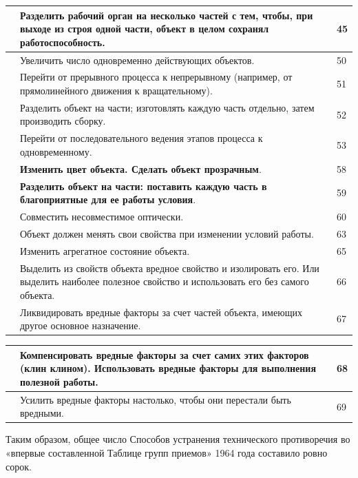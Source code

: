 \documentclass[11pt,a4paper]{article}
\begin{document}
\begin{center}
  \begin{tabular}{|p{}|p{}|p{}|}\hline
&\textbf{Разделить рабочий орган на несколько частей с тем, чтобы, при выходе
      из строя одной части, объект в целом сохранял работоспособность}.  &
    45\\\hline
&Увеличить число одновременно действующих объектов.  & 50\\\hline
&Перейти от прерывного процесса к непрерывному (например, от прямолинейного
движения к вращательному). & 51\\\hline
&Разделить объект на части; изготовлять каждую часть отдельно, затем
производить сборку. & 52\\\hline
&Перейти от последовательного ведения этапов процесса к одновременному. &
53\\\hline
&\textbf{Изменить цвет объекта. Сделать объект прозрачным}. & 58\\\hline
&\textbf{Разделить объект на части: поставить каждую часть в благоприятные для
  ее работы условия}. & 59\\\hline
&Совместить несовместимое оптически.& 60\\\hline
&Объект должен менять свои свойства при изменении условий работы.& 63\\\hline
&Изменить агрегатное состояние объекта.& 65\\\hline
&Выделить из свойств объекта вредное свойство и изолировать его. Или выделить
наиболее полезное свойство и использовать его без самого объекта. & 66\\\hline
&Ликвидировать вредные факторы за счет частей объекта, имеющих другое основное
назначение.& 67\\\hline
  \end{tabular}

  \begin{tabular}{|p{}|p{}|p{}|}\hline
&Компенсировать вредные факторы за счет самих этих факторов (клин клином).
Использовать вредные факторы для выполнения полезной работы. & 68\\\hline
&Усилить вредные факторы настолько, чтобы они перестали быть вредными. &
69\\\hline
  \end{tabular}
\end{center}

Таким образом, общее число Способов устранения технического противоречия во
«впервые составленной Таблице групп приемов» 1964 года составило ровно сорок.
\end{document}
